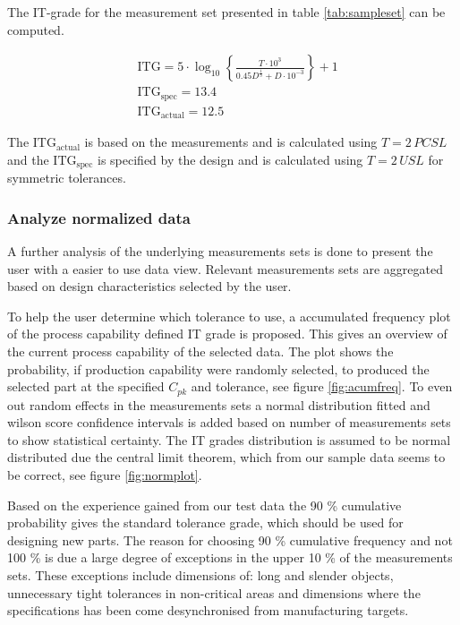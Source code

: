 \documentclass[aip,amsmath, reprint, author-year]{revtex4-1}
\begin{document}
The IT-grade for the measurement set presented in table \ref{tab:sampleset} can be computed.

\begin{align*}
&\mathrm{ITG} = 5 \cdot \log_{10} \left\{ \frac{T \cdot 10^3}{ 0.45  D^{\frac{1}{3}} + D \cdot10^{-3} }\right\} +1 \\
&\mathrm{ITG_{spec} }= 13.4 \\
&\mathrm{ITG_{actual}} = 12.5
\end{align*}

The $\mathrm{ITG_{actual}}$ is based on the measurements  and is calculated using $T = 2 \, PCSL$ and the $\mathrm{ITG_{spec}}$ is specified by the design and is calculated using $T = 2 \,USL$ for symmetric tolerances. 





\subsubsection{Analyze normalized data}
A further analysis of the underlying measurements sets is done to present the user with a easier to use data view. 
Relevant measurements sets are aggregated based on design characteristics selected by the user. 

To help the user determine which tolerance to use, a accumulated frequency plot of the process capability defined IT grade is proposed. 
This gives an overview of the current process capability of the selected data. The plot shows the probability, if production capability were randomly selected, to produced the selected part at the specified $C_{pk}$ and tolerance, see figure \ref{fig:acumfreq}. 
To even out random effects in the measurements sets a normal distribution fitted and wilson score confidence intervals is added based on number of measurements sets to show statistical certainty.  
The IT grades distribution is assumed to be normal distributed due the central limit theorem, which from our sample data seems to be correct, see figure \ref{fig:normplot}.

Based on the experience gained from our test data the 90 \% cumulative probability gives the standard tolerance grade, which should be used for designing new parts. 
The reason for choosing 90 \% cumulative frequency and not 100 \% is due a large degree of exceptions in the upper 10 \% of the measurements sets.
These exceptions include dimensions of: long and slender objects, unnecessary tight tolerances in non-critical areas and dimensions where the specifications has been come desynchronised from manufacturing targets.
\end{document}
